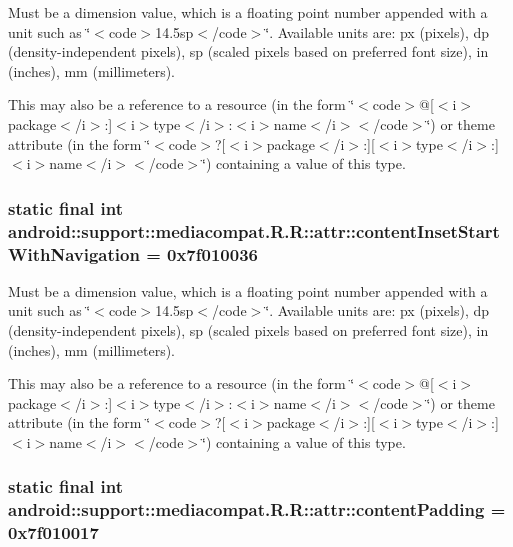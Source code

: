 Must be a dimension value, which is a floating point number appended with a unit such as \char`\"{}$<$code$>$14.5sp$<$/code$>$\char`\"{}. Available units are: px (pixels), dp (density-independent pixels), sp (scaled pixels based on preferred font size), in (inches), mm (millimeters). 

This may also be a reference to a resource (in the form \char`\"{}$<$code$>$@\mbox{[}$<$i$>$package$<$/i$>$:\mbox{]}$<$i$>$type$<$/i$>$:$<$i$>$name$<$/i$>$$<$/code$>$\char`\"{}) or theme attribute (in the form \char`\"{}$<$code$>$?\mbox{[}$<$i$>$package$<$/i$>$:\mbox{]}\mbox{[}$<$i$>$type$<$/i$>$:\mbox{]}$<$i$>$name$<$/i$>$$<$/code$>$\char`\"{}) containing a value of this type. \hypertarget{classandroid_1_1support_1_1mediacompat_1_1_r_1_1attr_f90f6d870ff11f252e9b8785fd76eb15}{
\subsubsection[{contentInsetStartWithNavigation}]{\setlength{\rightskip}{0pt plus 5cm}static final int android::support::mediacompat.R.R::attr::contentInsetStartWithNavigation = 0x7f010036}}
\label{classandroid_1_1support_1_1mediacompat_1_1_r_1_1attr_f90f6d870ff11f252e9b8785fd76eb15}


Must be a dimension value, which is a floating point number appended with a unit such as \char`\"{}$<$code$>$14.5sp$<$/code$>$\char`\"{}. Available units are: px (pixels), dp (density-independent pixels), sp (scaled pixels based on preferred font size), in (inches), mm (millimeters). 

This may also be a reference to a resource (in the form \char`\"{}$<$code$>$@\mbox{[}$<$i$>$package$<$/i$>$:\mbox{]}$<$i$>$type$<$/i$>$:$<$i$>$name$<$/i$>$$<$/code$>$\char`\"{}) or theme attribute (in the form \char`\"{}$<$code$>$?\mbox{[}$<$i$>$package$<$/i$>$:\mbox{]}\mbox{[}$<$i$>$type$<$/i$>$:\mbox{]}$<$i$>$name$<$/i$>$$<$/code$>$\char`\"{}) containing a value of this type. \hypertarget{classandroid_1_1support_1_1mediacompat_1_1_r_1_1attr_2d646ce988f652fb69a1d3bcee659af9}{
\subsubsection[{contentPadding}]{\setlength{\rightskip}{0pt plus 5cm}static final int android::support::mediacompat.R.R::attr::contentPadding = 0x7f010017}}
\label{classandroid_1_1support_1_1mediacompat_1_1_r_1_1attr_2d646ce988f652fb69a1d3bcee659af9}


